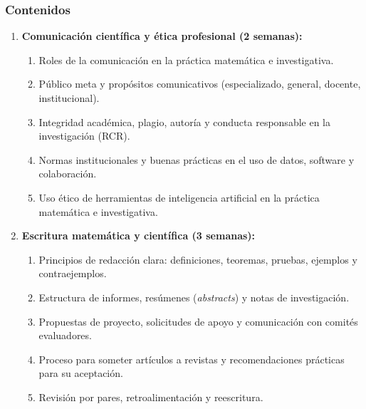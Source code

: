 \begin{refsection}
\subsubsection*{Contenidos}

\begin{enumerate}

\item \textbf{Comunicación científica y ética profesional (2 semanas):}
\begin{enumerate}
    \item Roles de la comunicación en la práctica matemática e investigativa.
    \item Público meta y propósitos comunicativos (especializado, general, docente, institucional).
    \item Integridad académica, plagio, autoría y conducta responsable en la investigación (RCR).
    \item Normas institucionales y buenas prácticas en el uso de datos, software y colaboración.
    \item Uso ético de herramientas de inteligencia artificial en la práctica matemática e investigativa.
\end{enumerate}

\item \textbf{Escritura matemática y científica (3 semanas):}
\begin{enumerate}
    \item Principios de redacción clara: definiciones, teoremas, pruebas, ejemplos y contraejemplos.
    \item Estructura de informes, resúmenes (\emph{abstracts}) y notas de investigación.
    \item Propuestas de proyecto, solicitudes de apoyo y comunicación con comités evaluadores.
    \item Proceso para someter artículos a revistas y recomendaciones prácticas para su aceptación.
    \item Revisión por pares, retroalimentación y reescritura.
\end{enumerate}



\end{enumerate}
\end{refsection}
